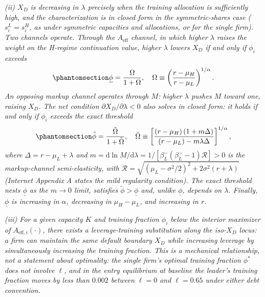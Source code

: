 \documentclass[
  11pt,
  letterpaper,
]{scrartcl}
\begin{document}
\emph{(ii) \(X_D\) is decreasing in \(\lambda\) precisely when the
training allocation is sufficiently high, and the characterization is in
closed form in the symmetric-shares case (\(s_i^L = s_i^H\), as under
symmetric capacities and allocations, or for the single firm). Two
channels operate. Through the \(A_{\text{eff}}\) channel, in which
higher \(\lambda\) raises the weight on the H-regime continuation value,
higher \(\lambda\) lowers \(X_D\) if and only if \(\phi_i\) exceeds}
\begin{equation}\protect\phantomsection\label{eq-phi-underbar}{
\underline{\phi} = \frac{\Omega}{1 + \Omega}, \quad \Omega \equiv \left(\frac{r - \mu_H}{r - \mu_L}\right)^{1/\alpha}.
}\end{equation} \emph{An opposing markup channel operates through \(M\):
higher \(\lambda\) pushes \(M\) toward one, raising \(X_D\). The net
condition \(\partial X_D / \partial \lambda < 0\) also solves in closed
form: it holds if and only if \(\phi_i\) exceeds the exact threshold}
\begin{equation}\protect\phantomsection\label{eq-phi-tilde}{
\tilde{\phi} = \frac{\tilde{\Omega}}{1 + \tilde{\Omega}}, \quad \tilde{\Omega} \equiv \left[\frac{(r - \mu_H)\,(1 + m\Delta)}{(r - \mu_L) - m\lambda\Delta}\right]^{1/\alpha},
}\end{equation} \emph{where \(\Delta = r - \mu_L + \lambda\) and
\(m = \mathrm{d}\ln M / \mathrm{d}\lambda = 1/[\beta_L^-(\beta_L^- - 1)\mathcal{R}] > 0\)
is the markup-channel semi-elasticity, with
\(\mathcal{R} = \sqrt{(\mu_L - \sigma^2/2)^2 + 2\sigma^2(r+\lambda)}\)
(Internet Appendix A states the mild regularity condition). The exact
threshold nests \(\underline{\phi}\) as the \(m \to 0\) limit, satisfies
\(\tilde{\phi} > \underline{\phi}\) and, unlike \(\underline{\phi}\),
depends on \(\lambda\). Finally, \(\underline{\phi}\) is increasing in
\(\alpha\), decreasing in \(\mu_H - \mu_L\), and increasing in \(r\).}

\emph{(iii) For a given capacity \(K\) and training fraction \(\phi_i\)
below the interior maximizer of \(A_{\text{eff},i}(\cdot)\), there
exists a leverage-training substitution along the iso-\(X_D\) locus: a
firm can maintain the same default boundary \(X_D\) while increasing
leverage by simultaneously increasing the training fraction. This is a
mechanical relationship, not a statement about optimality: the single
firm's optimal training fraction \(\phi^*\) does not involve \(\ell\),
and in the entry equilibrium at baseline the leader's training fraction
moves by less than \(0.002\) between \(\ell = 0\) and \(\ell = 0.65\)
under either debt convention.}
\end{document}
